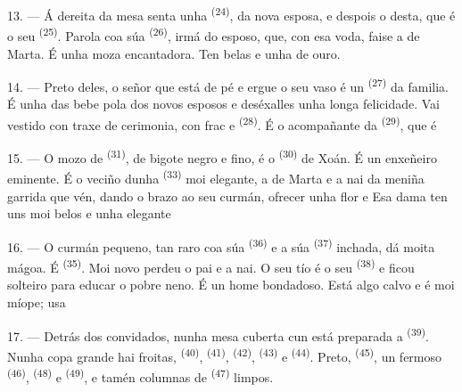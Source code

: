 \VUsaut{3.0mm}

13. --- Á dereita da mesa senta unha  \textsuperscript{(24)},
 da nova esposa, e despois o  desta, que é o seu
 \textsuperscript{(25)}. Parola coa súa  \textsuperscript{(26)}, irmá do esposo, que, con esa voda, faise a
 de Marta. É unha moza encantadora. Ten belas  e unha  de ouro.

14. --- Preto deles, o señor que está de pé e ergue o seu vaso é un 
\textsuperscript{(27)} da familia. É unha das 
 bebe pola  dos novos esposos e deséxalles unha longa
felicidade. Vai vestido con traxe de cerimonia, con frac e 
\textsuperscript{(28)}. É o acompañante da  \textsuperscript{(29)}, que é

15. --- O mozo de  \textsuperscript{(31)}, de bigote negro e fino, é o
 \textsuperscript{(30)} de Xoán. É un enxeñeiro eminente. É o veciño
dunha  \textsuperscript{(33)} moi elegante, a  de Marta e
a nai da meniña garrida que vén, dando o brazo ao seu curmán, ofrecer unha flor e
  Esa dama ten uns  moi belos e unha
elegante 

16. --- O curmán pequeno, tan raro coa súa  \textsuperscript{(36)} e a súa
 \textsuperscript{(37)} inchada, dá moita mágoa. É 
\textsuperscript{(35)}. Moi novo perdeu o pai e a nai. O seu tío é o seu
 \textsuperscript{(38)} e ficou solteiro para educar o pobre neno. É un
home bondadoso. Está algo calvo e é moi míope; usa 

\VUsaut{2.4mm}
\VUsaut{3.0mm}

17. --- Detrás dos convidados, nunha mesa cuberta cun  está preparada a
 \textsuperscript{(39)}. Nunha copa grande hai froitas,
 \textsuperscript{(40)},  \textsuperscript{(41)},
 \textsuperscript{(42)},  \textsuperscript{(43)} e
 \textsuperscript{(44)}. Preto, 
\textsuperscript{(45)}, un fermoso  \textsuperscript{(46)},
 \textsuperscript{(48)} e 
\textsuperscript{(49)}, e tamén columnas de  \textsuperscript{(47)} limpos.

